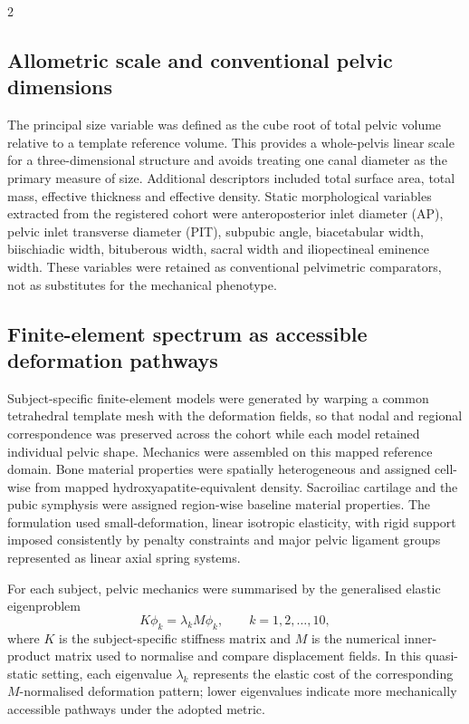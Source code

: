 \documentclass[openacc]{rsproca_new}
\begin{document}
\begin{multicols}{2}
\subsection{Allometric scale and conventional pelvic dimensions}

The principal size variable was defined as the cube root of total pelvic volume relative to a template reference volume. This provides a whole-pelvis linear scale for a three-dimensional structure and avoids treating one canal diameter as the primary measure of size. Additional descriptors included total surface area, total mass, effective thickness and effective density. Static morphological variables extracted from the registered cohort were anteroposterior inlet diameter (AP), pelvic inlet transverse diameter (PIT), subpubic angle, biacetabular width, biischiadic width, bituberous width, sacral width and iliopectineal eminence width. These variables were retained as conventional pelvimetric comparators, not as substitutes for the mechanical phenotype.

\subsection{Finite-element spectrum as accessible deformation pathways}

Subject-specific finite-element models were generated by warping a common tetrahedral template mesh with the deformation fields, so that nodal and regional correspondence was preserved across the cohort while each model retained individual pelvic shape. Mechanics were assembled on this mapped reference domain. Bone material properties were spatially heterogeneous and assigned cell-wise from mapped hydroxyapatite-equivalent density. Sacroiliac cartilage and the pubic symphysis were assigned region-wise baseline material properties. The formulation used small-deformation, linear isotropic elasticity, with rigid support imposed consistently by penalty constraints and major pelvic ligament groups represented as linear axial spring systems.

For each subject, pelvic mechanics were summarised by the generalised elastic eigenproblem
\begin{equation}
K\phi_{k} = \lambda_{k} M\phi_{k}, \qquad k=1,2,\ldots,10,
\end{equation}
where $K$ is the subject-specific stiffness matrix and $M$ is the numerical inner-product matrix used to normalise and compare displacement fields. In this quasi-static setting, each eigenvalue $\lambda_k$ represents the elastic cost of the corresponding $M$-normalised deformation pattern; lower eigenvalues indicate more mechanically accessible pathways under the adopted metric.


\end{multicols}
\end{document}
